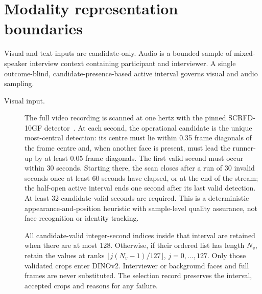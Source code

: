 \section{Modality representation boundaries}

\begin{sloppypar}
Visual and text inputs are candidate-only. Audio is a bounded sample of mixed-speaker interview
context containing participant and interviewer. A single outcome-blind, candidate-presence-based
active interval governs visual and audio sampling.
\end{sloppypar}

\begin{description}
    \item[Visual input.] The full video recording is scanned at one
    hertz with the pinned SCRFD-10GF detector~\cite{Guo2022SCRFD}. At each second, the operational
    candidate is the unique most-central detection: its centre must lie within 0.35 frame diagonals
    of the frame centre and, when another face is present, must lead the runner-up by at least 0.05
    frame diagonals. The first valid second must occur within 30 seconds. Starting there, the scan
    closes after a run of 30 invalid seconds once at least 60 seconds have elapsed, or at the end of
    the stream; the half-open active interval ends one second after its last valid detection. At
    least 32 candidate-valid seconds are required. This is a deterministic appearance-and-position
    heuristic with sample-level quality assurance, not face recognition or identity tracking.

    All candidate-valid integer-second indices inside that interval are retained when there are at
    most 128. Otherwise, if their ordered list has length $N_v$, retain the values at ranks
    $\lfloor j(N_v-1)/127\rfloor$, $j=0,\ldots,127$. Only those validated crops enter DINOv2.
    Interviewer or background faces and full frames are never substituted. The selection record
    preserves the interval, accepted crops and reasons for any failure.


\end{description}
